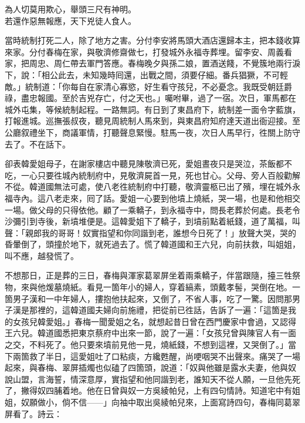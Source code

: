 \begin{myquote}
為人切莫用欺心，舉頭三尺有神明。\\若還作惡無報應，天下兇徒人食人。
\end{myquote}

當時統制打死二人，除了地方之害。分付李安將馬頭大酒店還歸本主，把本錢收算來家。分付春梅在家，與敬濟修齋做七，打發城外永福寺葬埋。{}留李安、周義看家，把周忠、周仁帶去軍門答應。春梅晚夕與孫二娘，置酒送餞，不覺簇地兩行淚下，說：「相公此去，未知幾時囘還，出戰之間，須要仔細。番兵猖獗，不可輕敵。」統制道：「你每自在家清心寡慾，好生看守孩兒，不必憂念。我既受朝廷爵祿，盡忠報國。至於吉兇存亡，付之天也。」{}囑咐畢，過了一宿。次日，軍馬都在城外屯集，等候統制起程。一路無詞。有日到了東昌府下，統制差一面令字藍旗，打報進城。巡撫張叔夜，聽見周統制人馬來到，與東昌府知府達天道出衙迎接。至公廳叙禮坐下，商議軍情，打聽聲息緊慢。駐馬一夜，次日人馬早行，徃關上防守去了。不在話下。

卻表韓愛姐母子，在謝家樓店中聽見陳敬濟已死，愛姐晝夜只是哭泣，茶飯都不吃，一心只要徃城內統制府中，見敬濟屍首一見，死也甘心。{}父母、旁人百般勸解不從。韓道國無法可處，使八老徃統制府中打聽，敬濟靈柩已出了殯，埋在城外永福寺內。這八老走來，囘了話。愛姐一心要到他墳上燒紙，哭一場，也是和他相交一場。做父母的只得依他。顧了一乘轎子，到永福寺中，問長老葬於何處。長老令沙彌引到寺後，{}新墳堆便是。這韓愛姐下了轎子，到墳前點着紙錢，道了萬福，叫聲：「親郎我的哥哥！奴實指望和你同諧到老，誰想今日死了！」放聲大哭，哭的昏暈倒了，頭撞於地下，就死過去了。{}慌了韓道國和王六兒，向前扶救，叫姐姐，叫不應，越發慌了。

不想那日，正是葬的三日，春梅與渾家葛翠屏坐着兩乘轎子，伴當跟隨，擡三牲祭物，來與他煖墓燒紙。看見一箇年小的婦人，穿着縞素，頭戴孝髻，哭倒在地。一箇男子漢和一中年婦人，摟抱他扶起來，又倒了，不省人事，吃了一驚。因問那男子漢是那裡的，這韓道國夫婦向前施禮，把從前已徃話，告訴了一遍：「這箇是我的女孩兒韓愛姐。」春梅一聞愛姐之名，就想起昔日曾在西門慶家中會過，又認得王六兒。韓道國悉把東京蔡府中出來一節，說了一遍：「女孩兒曾與陳官人有一面之交，不料死了。他只要來墳前見他一見，燒紙錢，不想到這裡，又哭倒了。」當下兩箇救了半日，這愛姐吐了口粘痰，方纔甦醒，尚哽咽哭不出聲來。痛哭了一場起來，與春梅、翠屏插燭也似磕了四箇頭，{}說道：「奴與他雖是露水夫妻，他與奴說山盟，言海誓，情深意厚，實指望和他同諧到老，誰知天不從人願，一旦他先死了，撇得奴四脯着地。他在日曾與奴一方吳綾帕兒，上有四句情詩。知道宅中有姐姐，奴願做小，倘不信——」向袖中取出吳綾帕兒來，上面寫詩四句，春梅同葛翠屏看了。詩云：

